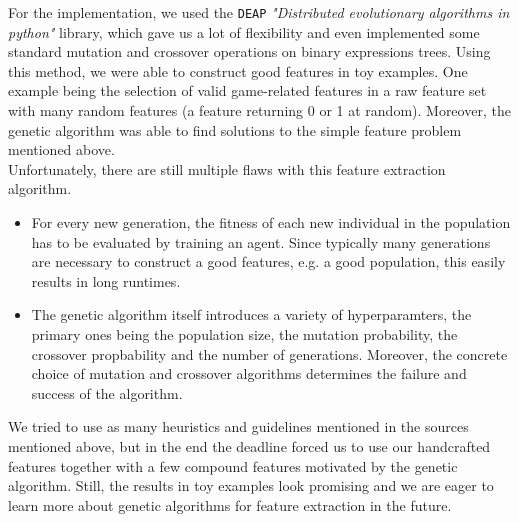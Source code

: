 For the implementation, we used the \texttt{DEAP} \emph{"Distributed evolutionary algorithms in python"} library, which gave us a lot of flexibility and even implemented some standard mutation and crossover operations on binary expressions trees. Using this method, we were able to construct good features in toy examples. One example being the selection of valid game-related features in a raw feature set with many random features (a feature returning 0 or 1 at random). Moreover, the genetic algorithm was able to find solutions to the simple feature problem mentioned above. \\

Unfortunately, there are still multiple flaws with this feature extraction algorithm.
\begin{itemize}
	\item For every new generation, the fitness of each new individual in the population has to be evaluated by training an agent. Since typically many generations are necessary to construct a good features, e.g. a good population, this easily results in long runtimes. 
	\item The genetic algorithm itself introduces a variety of hyperparamters, the primary ones being the population size, the mutation probability, the crossover propbability and the number of generations. Moreover, the concrete choice of mutation and crossover algorithms determines the failure and success of the algorithm. 
\end{itemize}
We tried to use as many heuristics and guidelines mentioned in the sources mentioned above, but in the end the deadline forced us to use our handcrafted features together with a few compound features motivated by the genetic algorithm. Still, the results in toy examples look promising and we are eager to learn more about genetic algorithms for feature extraction in the future. 


